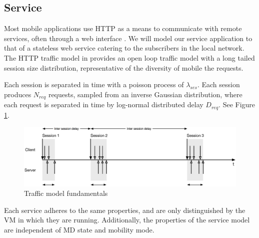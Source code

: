 \subsection{Service}
Most mobile applications use HTTP as a means to communicate with remote services, often through a web interface \cite{maier2010first,falaki2010first}. We will model our service application to that of a stateless web service catering to the subscribers in the local network. The HTTP traffic model in \cite{reyes1999page} provides an open loop traffic model with a long tailed session size distribution, representative of the diversity of mobile the requests. 

Each session is separated in time with a poisson process of $\lambda_{ses}$. Each session produces $N_{req}$ requests, sampled from an inverse Gaussian distribution, where each request is separated in time by log-normal distributed delay $D_{req}$. See Figure \ref{fig:traffic_model}.

\begin{figure}[tb]
	\centering
	\includegraphics[width=0.8\linewidth]{fig_traffic_model.eps} 
	\caption{Traffic model fundamentals}
	\label{fig:traffic_model}
\end{figure}

Each service adheres to the same properties, and are only distinguished by the \ac{VM} in which they are running. Additionally, the properties of the service model are independent of \ac{MD} state and mobility mode.

